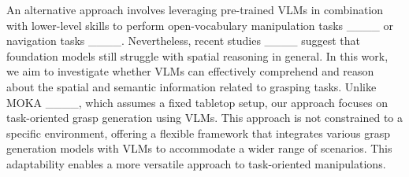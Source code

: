 An alternative approach involves leveraging pre-trained VLMs in combination with lower-level skills to perform open-vocabulary manipulation tasks ____ or navigation tasks ____. Nevertheless, recent studies ____ suggest that foundation models still struggle with spatial reasoning in general. In this work, we aim to investigate whether VLMs can effectively comprehend and reason about the spatial and semantic information related to grasping tasks. Unlike MOKA ____, which assumes a fixed tabletop setup, our approach focuses on task-oriented grasp generation using VLMs. This approach is not constrained to a specific environment, offering a flexible framework that integrates various grasp generation models with VLMs to accommodate a wider range of scenarios. This adaptability enables a more versatile approach to task-oriented manipulations.